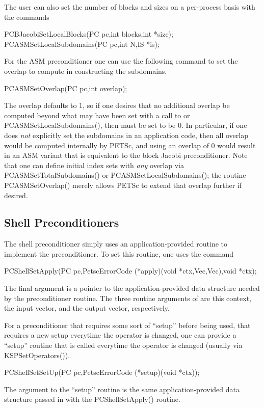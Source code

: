 The user can also set the number of blocks and sizes on a per-process
basis with the commands
\begin{tabbing}
  PCBJacobiSetLocalBlocks(PC pc,int blocks,int *size);\\
  PCASMSetLocalSubdomains(PC pc,int N,IS *is);
\end{tabbing}

For the ASM preconditioner one can use the following command to set
the overlap to compute in constructing the subdomains.
\begin{tabbing}
  PCASMSetOverlap(PC pc,int overlap);
\end{tabbing}
The overlap defaults to 1, so if one desires that no additional
overlap be computed beyond what may have been set with a call to  or PCASMSetLocalSubdomains(), then
 must be set to be 0.  In particular, if one does {\em
not} explicitly set the subdomains in an application code, then all
overlap would be computed internally by PETSc, and using an overlap of
0 would result in an ASM variant that is equivalent to the block
Jacobi preconditioner.  Note that one can define initial index sets
 with {\em any} overlap via PCASMSetTotalSubdomains() or
PCASMSetLocalSubdomains(); the routine PCASMSetOverlap()
merely allows PETSc to extend that overlap further if desired.

\subsection{Shell Preconditioners}

The shell preconditioner simply uses an application-provided routine to 
implement the preconditioner. To set this routine, one uses the 
command 
\begin{tabbing}
  PCShellSetApply(PC pc,PetscErrorCode (*apply)(void *ctx,Vec,Vec),void *ctx);
\end{tabbing}
The final argument  is a pointer to the application-provided 
data structure needed by the preconditioner routine.
The three routine arguments of  are this context, the
input vector, and the output vector, respectively.

For a preconditioner that requires some sort of ``setup'' before being used,
that requires a new setup everytime the operator is changed, one can 
provide a ``setup'' routine that is called everytime the operator is 
changed (usually via KSPSetOperators()).
\begin{tabbing}
  PCShellSetSetUp(PC pc,PetscErrorCode (*setup)(void *ctx));
\end{tabbing}
The argument to the ``setup'' routine is the same application-provided 
data structure passed in with the PCShellSetApply() routine.

